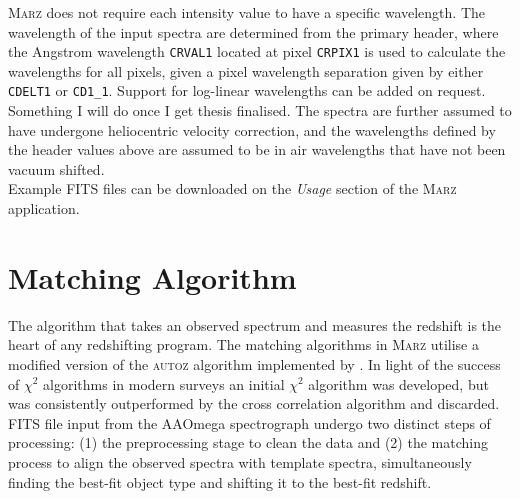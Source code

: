 \documentclass[iop]{emulateapj}
\newcommand{\red}{\color{red}}
\newcommand{\autoz}{\textsc{autoz}}
\newcommand{\marz}{\textsc{Marz}}
\begin{document}
\marz{} does not require each intensity value to have a specific wavelength. The wavelength of the input spectra are determined from the primary header, where the Angstrom wavelength \verb;CRVAL1; located at pixel \verb;CRPIX1; is used to calculate the wavelengths for all pixels, given a pixel wavelength separation given by either \verb;CDELT1; or \verb;CD1_1;. Support for log-linear wavelengths can be added on request. {\red Something I will do once I get thesis finalised}. The spectra are further assumed to have undergone heliocentric velocity correction, and the wavelengths defined by the header values above are assumed to be in air wavelengths that have not been vacuum shifted.\\

Example FITS files can be downloaded on the \textit{Usage} section of the \marz{} application.













\section{Matching Algorithm}

The algorithm that takes an observed spectrum and measures the redshift is the heart of any redshifting program. The matching algorithms in \marz{} utilise a modified version of the \autoz{} algorithm implemented by \citet{baldry2014galaxy}. In light of the success of $\chi^2$ algorithms in modern surveys \citep{bolton2012} an initial $\chi^2$ algorithm was developed, but was consistently outperformed by the cross correlation algorithm and discarded. FITS file input from the AAOmega spectrograph undergo two distinct steps of processing: (1) the preprocessing stage to clean the data and (2) the matching process to align the observed spectra with template spectra, simultaneously finding the best-fit object type and shifting it to the best-fit redshift.\\
\end{document}
